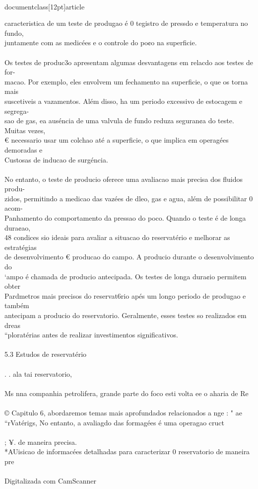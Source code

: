 \\documentclass[12pt]{article}
\begin{document}
caracteristica de um teste de produgao é 0 tegistro de pressdo e temperatura no fundo,\\
juntamente com as medicées e o controle do po¢o na superficie.\\
\\
Os testes de produc3o apresentam algumas desvantagens em relacdo aos testes de for-\\
macao. Por exemplo, eles envolvem um fechamento na superficie, o que os torna mais\\
suscetiveis a vazamentos. Além disso, ha um periodo excessivo de estocagem e segrega-\\
sao de gas, ea auséncia de uma valvula de fundo reduza seguran¢a do teste. Muitas vezes,\\
€ necessario usar um colchao até a superficie, o que implica em operagées demoradas e\\
Custosas de inducao de surgéncia.\\
\\
No entanto, o teste de producio oferece uma avaliacao mais precisa dos fluidos produ-\\
zidos, permitindo a medicao das vazées de dleo, gas e agua, além de possibilitar 0 acom-\\
Panhamento do comportamento da pressao do poco. Quando o teste é de longa dura¢ao,\\
48 condices sio ideais para avaliar a situacao do reservatério e melhorar as estratégias\\
de desenvolvimento € producao do campo. A producio durante o desenvolvimento do\\
‘ampo é chamada de producio antecipada. Os testes de longa dura¢io permitem obter\\
Pardmetros mais precisos do reservat6rio apés um longo periodo de produgao e também\\
antecipam a producio do reservatorio. Geralmente, esses testes so realizados em dreas\\
“ploratérias antes de realizar investimentos significativos.\\
\\
5.3 Estudos de reservatério\\
\\
. . ala tai reservatorio,\\
\\
Ms nna companhia petrolifera, grande parte do foco esti volta ee o aharia de Re\\
\\
© Capitulo 6, abordaremos temas mais aprofundados relacionados a nge : " ae\\
“rVatérigs, No entanto, a avaliagdo das formagées é uma operagao cruct\\
\\
; ¥. de maneira precisa.\\
*AUisicao de informacées detalhadas para caracterizar 0 reservatorio de maneira pre\\
\\
Digitalizada com CamScanner\\
\end{document}
